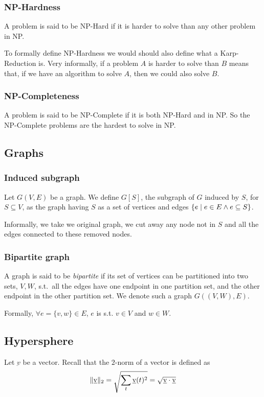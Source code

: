     \subsubsection{NP-Hardness}
        A problem is said to be NP-Hard if it is harder to solve than any other problem in NP.

        To formally define NP-Hardness we would should also define what a Karp-Reduction is.
        Very informally, if a problem $A$ is harder to solve than $B$ means that, if we have an algorithm to solve $A$, then we could also solve $B$.

    \subsubsection{NP-Completeness}
        A problem is said to be NP-Complete if it is both NP-Hard and in NP.
        So the NP-Complete problems are the hardest to solve in NP.


\subsection{Graphs}

    \subsubsection{Induced subgraph}\label{subsubsec:induced_subgraph}
        Let $G(V,E)$ be a graph. We define $G[S]$, the subgraph of $G$ induced by $S$, for $S \subseteq V$, as the graph having $S$ as a set of vertices and edges $\{ e \; \vert \; e \in E \wedge e \subseteq S \}$.

        Informally, we take we original graph, we cut away any node not in $S$ and all the edges connected to these removed nodes.

    \subsubsection{Bipartite graph}\label{subsubsec:bipartitegraph}
        A graph is said to be \textit{bipartite} if its set of vertices can be partitioned into two sets, $V,W$, s.t.~all the edges have one endpoint in one partition set, and the other endpoint in the other partition set.
        We denote such a graph $G((V,W),E)$.

        Formally, $\forall e = \{v,w\} \in E$, $e$ is s.t. $v \in V$ and $w \in W$.


\subsection{Hypersphere}\label{subsec:hypersphere}
    Let $\underbar{v}$ be a vector. Recall that the $2$-norm of a vector is defined as
    \[ \lVert \underbar{v} \rVert_2 = \sqrt{\sum_t \underbar{v}(t)^2} = \sqrt{\underbar{v} \cdot \underbar{v}} \]

